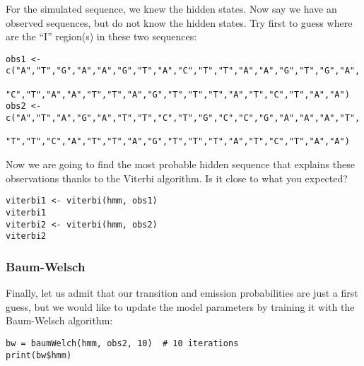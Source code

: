 \documentclass[a4paper,11pt]{article}
\begin{document}
For the simulated sequence, we knew the hidden states. Now say we have an observed sequences, but
do not know the hidden states. Try first to guess where are the ``I'' region(s) in these two sequences:

\begin{verbatim}
obs1 <- c("A","T","G","A","A","G","T","A","C","T","T","A","A","G","T","G","A",
          "C","T","A","A","T","T","A","G","T","T","T","A","T","C","T","A","A")
obs2 <- c("A","T","A","G","A","T","T","C","T","G","C","C","G","A","A","A","T",
          "T","T","C","A","T","T","A","G","T","T","T","A","T","C","T","A","A")
\end{verbatim}

Now we are going to find the most probable hidden sequence that explains these observations thanks to the Viterbi algorithm. Is it close to what you expected?

\begin{verbatim}
viterbi1 <- viterbi(hmm, obs1)
viterbi1
viterbi2 <- viterbi(hmm, obs2)
viterbi2
\end{verbatim}

\subsubsection{Baum-Welsch}

Finally, let us admit that our transition and emission probabilities are just a first guess, but we would like to update the model parameters by training it with the Baum-Welsch algorithm:

\begin{verbatim}
bw = baumWelch(hmm, obs2, 10)  # 10 iterations
print(bw$hmm)
\end{verbatim}
\end{document}
